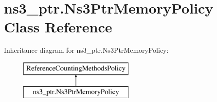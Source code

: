 \hypertarget{classns3__ptr_1_1Ns3PtrMemoryPolicy}{}\section{ns3\+\_\+ptr.\+Ns3\+Ptr\+Memory\+Policy Class Reference}
\label{classns3__ptr_1_1Ns3PtrMemoryPolicy}
Inheritance diagram for ns3\+\_\+ptr.\+Ns3\+Ptr\+Memory\+Policy\+:\begin{figure}[H]
\begin{center}
\leavevmode
\includegraphics[height=2.000000cm]{classns3__ptr_1_1Ns3PtrMemoryPolicy}
\end{center}
\end{figure}
